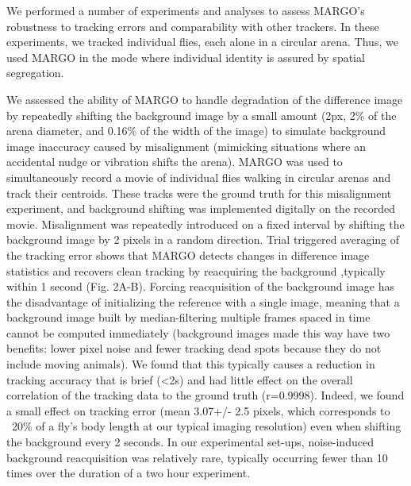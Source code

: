 \documentclass[10pt]{article}
\begin{document}
\begin{multicols}{2}
We performed a number of experiments and analyses to assess MARGO's robustness to tracking errors and comparability with other trackers. In these experiments, we tracked individual flies, each alone in a circular arena. Thus, we used MARGO in the mode where individual identity is assured by spatial segregation.

We assessed the ability of MARGO to handle degradation of the difference image by repeatedly shifting the background image by a small amount (2px, 2\% of the arena diameter, and 0.16\% of the width of the image) to simulate background image inaccuracy caused by misalignment (mimicking situations where an accidental nudge or vibration shifts the arena). MARGO was used to simultaneously record a movie of individual flies walking in circular arenas and track their centroids. These tracks were the ground truth for this misalignment experiment, and background shifting was implemented digitally on the recorded movie. Misalignment was repeatedly introduced on a fixed interval by shifting the background image by 2 pixels in a random direction. Trial triggered averaging of the tracking error shows that MARGO detects changes in difference image statistics and recovers clean tracking by reacquiring the background ,typically within 1 second (Fig. 2A-B). Forcing reacquisition of the background image has the disadvantage of initializing the reference with a single image, meaning that a background image built by median-filtering multiple frames spaced in time cannot be computed immediately (background images made this way have two benefits: lower pixel noise and fewer tracking dead spots because they do not include moving animals). We found that this typically causes a reduction in tracking accuracy that is brief (<2s) and had little effect on the overall correlation of the tracking data to the ground truth (r=0.9998). Indeed, we found a small effect on tracking error (mean 3.07+/- 2.5 pixels, which corresponds to ~20\% of a fly's body length at our typical imaging resolution) even when shifting the background every 2 seconds. In our experimental set-ups, noise-induced background reacquisition was relatively rare, typically occurring fewer than 10 times over the duration of a two hour experiment.


\end{multicols}
\end{document}
